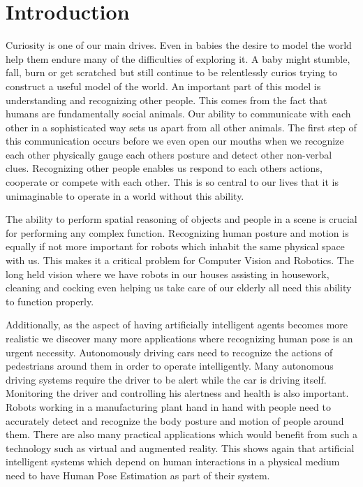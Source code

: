 
\chapter{Introduction}\label{chapter:introduction}

Curiosity is one of our main drives. Even in babies the desire to model the world help them endure  many of the difficulties of exploring it. A baby might stumble, fall, burn or get scratched but still  continue to be relentlessly curios trying to construct a useful model of the world. An important part of this model is understanding and recognizing other people. This comes from the fact that humans are fundamentally social animals. Our ability to communicate with each other in a sophisticated way sets us apart from all other animals. The first step of this communication occurs before we even open our mouths when we recognize each other physically gauge each others posture and detect other non-verbal clues. Recognizing other people enables us respond to each others actions, cooperate or compete with each other. This is so central to our lives that it is unimaginable to operate in a world without this ability. 

The ability to perform spatial reasoning of objects and people in a scene is crucial for performing any complex function. Recognizing human posture and motion is equally if not more important for robots which inhabit the same physical space with us. This makes it a critical problem for Computer Vision and Robotics. The long held vision where we have robots in our houses assisting in housework, cleaning and cocking even helping us take care of our elderly all need this ability to function properly.

Additionally, as the aspect of having artificially intelligent agents becomes more realistic we discover many more applications where recognizing human pose is an urgent necessity. Autonomously driving cars need to recognize the actions of pedestrians around them in order to operate intelligently. Many autonomous driving systems require the driver to be alert while the car is driving itself. Monitoring the driver and controlling his alertness and health is also important. Robots working in a manufacturing plant hand in hand with people need to accurately detect and recognize the body posture and motion of people around them. There are also many practical applications which would benefit from such a technology such as virtual and augmented reality. This shows again that artificial intelligent systems which depend on human interactions in a physical medium need to have Human Pose Estimation as part of their system.

